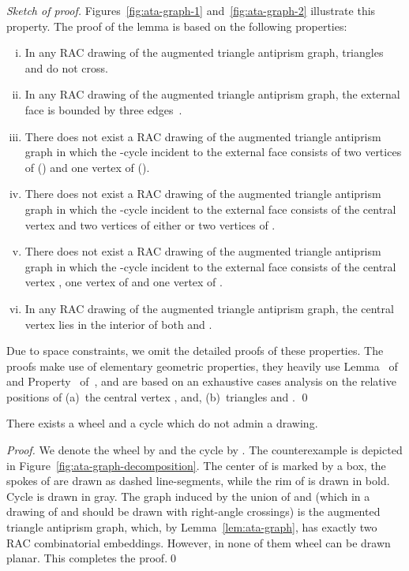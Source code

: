 \documentclass{llncs}
\newenvironment{sketchofproof}{\noindent\textit{Sketch of
proof.}}{\mbox{}\hfill\qed\par\medskip}
\begin{document}
\begin{sketchofproof}
Figures~\ref{fig:ata-graph-1} and~\ref{fig:ata-graph-2} illustrate
this property. The proof of the lemma is based on the following
properties:

\begin{enumerate}[i)]
\item In any RAC drawing of the augmented triangle antiprism graph,
triangles  and  do not cross.

\item In any RAC drawing of the augmented triangle antiprism graph,
the external face is bounded by three edges~\cite{EL11}.

\item There does not exist a RAC drawing of the augmented triangle
antiprism graph in which the -cycle incident to the external face
consists of two vertices of  () and
one vertex of  ().

\item There does not exist a RAC drawing of the augmented triangle
antiprism graph in which the -cycle incident to the external face
consists of the central vertex  and two vertices of either
 or two vertices of .

\item There does not exist a RAC drawing of the augmented triangle
antiprism graph in which the -cycle incident to the external face
consists of the central vertex , one vertex of 
and one vertex of .

\item In any RAC drawing of the augmented triangle antiprism
graph, the central vertex  lies in the interior of both
 and .
\end{enumerate}

Due to space constraints, we omit the detailed proofs of these
properties. The proofs make use of elementary geometric properties,
they heavily use Lemma~ of~\cite{DEL09} and Property~
of~\cite{ACBDFKS09}, and are based on an exhaustive cases analysis
on the relative positions of (a)~the central vertex , and,
(b)~triangles  and .
\end{sketchofproof}

\begin{theorem}
\label{thm:wheel-cycle} There exists a wheel and a cycle which do
not admin a  drawing.
\end{theorem}
\begin{proof}
We denote the wheel by  and the cycle by .
The counterexample is depicted in
Figure~\ref{fig:ata-graph-decomposition}. The center of
 is marked by a box, the spokes of  are
drawn as dashed line-segments, while the rim of  is
drawn in bold. Cycle  is drawn in gray. The graph
induced by the union of  and  (which in a
 drawing of  and  should be
drawn with right-angle crossings) is the augmented triangle
antiprism graph, which, by Lemma~\ref{lem:ata-graph}, has exactly
two RAC combinatorial embeddings. However, in none of them wheel
 can be drawn planar. This completes the proof.\qed
\end{proof}
\end{document}
